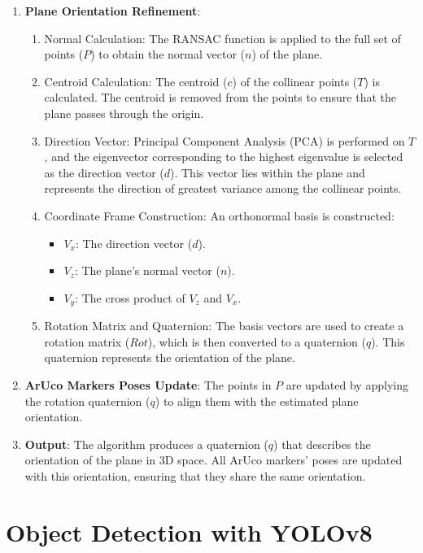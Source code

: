 \begin{enumerate}
    \item \textbf{Plane Orientation Refinement}:
        \begin{enumerate}
            \item Normal Calculation: The RANSAC function is applied to the full set of points ($P$) to obtain
            the normal vector ($n$) of the plane.
            \item Centroid Calculation: The centroid ($c$) of the collinear points ($T$) is calculated. 
            The centroid is removed from the points to ensure that the plane passes through the origin.
            \item Direction Vector: Principal Component Analysis (PCA) is performed on $T$, and the eigenvector corresponding
            to the highest eigenvalue is selected as the direction vector ($d$). This vector lies within the plane
            and represents the direction of greatest variance among the collinear points.
            \item Coordinate Frame Construction: An orthonormal basis is constructed:
                \begin{itemize}
                    \item $V_x$: The direction vector ($d$).
                    \item $V_z$: The plane's normal vector ($n$).
                    \item $V_y$: The cross product of $V_z$ and $V_x$.
                \end{itemize}
            \item Rotation Matrix and Quaternion: The basis vectors are used to create a rotation matrix 
            ($Rot$), which is then converted to a quaternion ($q$). This quaternion represents the orientation of the plane.
        \end{enumerate}

    \item \textbf{ArUco Markers Poses Update}: The points in $P$ are updated by applying the rotation quaternion ($q$) 
    to align them with the estimated plane orientation.
    \item \textbf{Output}: The algorithm produces a quaternion ($q$) that describes the orientation of the plane in 3D space.
    All ArUco markers' poses are updated with this orientation, ensuring that they share the same orientation.
\end{enumerate}


\section{Object Detection with YOLOv8}
\label{sec:yolov8}

